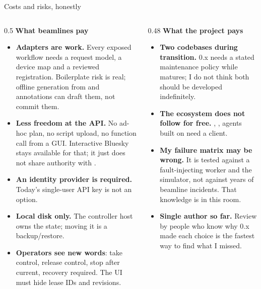 \begin{frame}{Costs and risks, honestly}
    \begin{columns}[T]
        \begin{column}{0.5\textwidth}
            \textbf{What beamlines pay}
            \small
            \begin{itemize}
                \item \textbf{Adapters are work.} Every exposed workflow needs a request model, a device map
                      and a reviewed registration. Boilerplate risk is real; offline generation from
                       and annotations can draft them, not commit them.
                \item \textbf{Less freedom at the API.} No ad-hoc plan, no script upload, no function call
                      from a GUI. Interactive Bluesky stays available for that; it just does not share
                      authority with \vtwo{}.
                \item \textbf{An identity provider is required.} Today's single-user API key is not an option.
                \item \textbf{Local disk only.} The controller host owns the state; moving it is a backup/restore.
                \item \textbf{Operators see new words}: take control, release control, stop after current,
                      recovery required. The UI must hide lease IDs and revisions.
            \end{itemize}
        \end{column}
        \begin{column}{0.48\textwidth}
            \textbf{What the project pays}
            \small
            \begin{itemize}
                \item \textbf{Two codebases during transition.} 0.x needs a stated maintenance policy
                      while \vtwo{} matures; I do not think both should be developed indefinitely.
                \item \textbf{The ecosystem does not follow for free.} ,
                      , agents built on  need a \vtwo{} client.
                \item \textbf{My failure matrix may be wrong.} It is tested against a fault-injecting
                      worker and the simulator, not against years of beamline incidents. That knowledge is
                      in this room.
                \item \textbf{Single author so far.} Review by people who know why 0.x made each choice
                      is the fastest way to find what I missed.
            \end{itemize}
        \end{column}
    \end{columns}
\end{frame}

